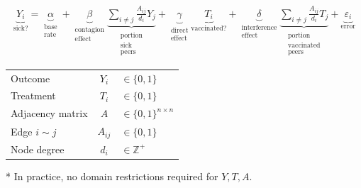 \documentclass[aspectratio=169]{beamer}
\theoremstyle{remark}
\begin{document}
\begin{frame}

    \begin{align*}
        \underbrace{Y_i}_\text{sick?} =
        \underbrace{\alpha}_{\substack{\text{base}                                    \\ \text{rate}}} +
        \underbrace{\beta}_{\substack{\text{contagion}                                \\ \text{effect}}}
        \underbrace{\sum_{i \neq j} \frac{A_{ij}}{d_i} Y_j}_{\substack{\text{portion} \\ \text{sick} \\ \text{peers}}} + 
        \underbrace{\gamma}_{\substack{\text{direct}                                  \\ \text{effect}}}
        \underbrace{T_i}_\text{vaccinated?} + 
        \underbrace{\delta}_{\substack{\text{interference}                            \\ \text{effect}}}
        \underbrace{\sum_{i \neq j} \frac{A_{ij}}{d_i} T_j}_{\substack{\text{portion} \\ \text{vaccinated} \\ \text{peers}}} +
        \underbrace{\varepsilon_i}_\text{error}
    \end{align*}
    
    {
    \footnotesize
    \begin{table}[]
        \begin{tabular}{lcl}
            Outcome          & $Y_i$    & $\in \{0, 1\}$              \\
            Treatment        & $T_i$    & $\in \{0, 1\}$              \\
            Adjacency matrix & $A$      & $\in \{0, 1\}^{n \times n}$ \\
            Edge $i \sim j$  & $A_{ij}$ & $\in \{0, 1\}$              \\
            Node degree      & $d_i$    & $\in \mathbb{Z}^+$          \\
        \end{tabular}
    \end{table}
    
    * In practice, no domain restrictions required for $Y, T, A$.
    }
\end{frame}
\end{document}
